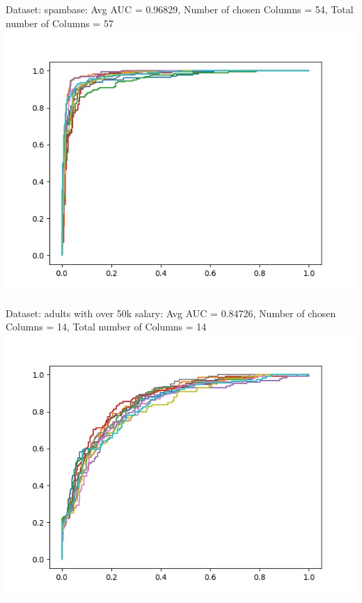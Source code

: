 \documentclass[twoside]{article}
\begin{document}
Dataset: spambase: Avg AUC = 0.96829, Number of chosen Columns =  54, Total number of Columns =  57\\
\includegraphics[scale=0.4]{Plots/Spambase_PCA_Z_Score.jpg}
\newpage

Dataset: adults with over 50k salary: Avg AUC = 0.84726, Number of chosen Columns =  14, Total number of Columns =  14\\
\includegraphics[scale=0.4]{Plots/Adult_PCA_Z_Score.jpg}
	
\end{document}
